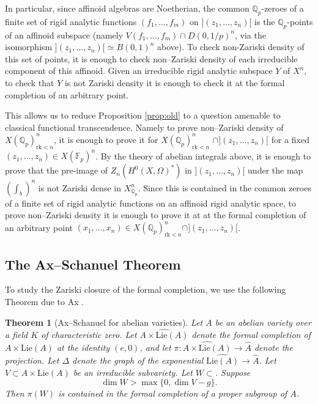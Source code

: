 \documentclass{amsart}
\def\Q{\mathbb Q}
\newcommand{\rk}{\mathrm{rk}}
\theoremstyle{plain}
\newtheorem{theorem}{Theorem}
\theoremstyle{definition}
\newcommand{\Lie}{\mathrm{Lie}}
\newcommand{\F}{\mathbb{F}}
\begin{document}
In particular, since affinoid algebras are Noetherian, the common $\Q _p $-zeroes of a finite set of rigid analytic functions $(f_1 ,\ldots ,f_m )$ on $](z_1 ,\ldots ,z_n )[$ is the $\Q _p $-points of an affinoid subspace (namely $V(f_1 ,\ldots ,f_m )\cap D(0,1/p)^n$, via the isomorphism $](z_1 ,\ldots ,z_n )[\simeq B(0,1)^n$ above). To check non-Zariski density of this set of points, it is enough to check non--Zariski density of each irreducible component of this affinoid. Given an irreducible rigid analytic subspace $Y$ of $X^n$, to check that $Y$ is not Zariski density it is enough to check it at the formal completion of an arbitrary point.

This allows us to reduce Proposition \ref{prop:old} to a question amenable to classical functional transcendence. Namely to prove non--Zariski density of $X(\Q _p )^n _{\rk <n}$, it is enough to prove it for $X(\Q _p )^n _{\rk <n}$ $ \cap ](z_1 ,\ldots ,z_n )[$ for a fixed $(z_1 ,\ldots ,z_n )\in X(\F _p )^n $. By the theory of abelian integrals above, it is enough to prove that the pre-image of $Z_n (H^0 (X,\Omega )^* )$ in $](z_1 ,\ldots ,z_n )[$ under the map $(\int _b )^n $ is not Zariski dense in $X^n _{\Q _p }$. Since this is contained in the common zeroes of a finite set of rigid analytic functions on an affinoid rigid analytic space, to prove non--Zariski density it is enough to prove it at at the formal completion of an arbitrary point $(x_1 ,\ldots ,x_n )\in X(\Q _p )^n _{\rk <n} \cap ](z_1 ,\ldots , z_n )[$.
\subsection{The Ax--Schanuel Theorem}
To study the Zariski closure of the formal completion, we use the following Theorem due to Ax \cite{ax1972some}.
\begin{theorem}[Ax--Schanuel for abelian varieties]\label{thm:AS}
Let $A$ be an abelian variety over a field $K$ of characteristic zero. Let $\widehat{A\times \Lie (A)}$ denote the formal completion of $A\times \Lie (A)$ at the identity $(e,0)$, and let $\pi :\widehat{A\times \Lie (A)}\to \widehat{A}$ denote the projection. Let $\Delta $ denote the graph of the exponential $\widehat{\Lie (A)}\to \widehat{A}$. Let $V\subset A\times \Lie (A)$ be an irreducible subvariety. Let $W\subset $. Suppose 
\[
\dim W >\max \{0,\dim V-g\}.
\]
Then $\pi (W)$ is contained in the formal completion of a proper subgroup of $A$.
\end{theorem}
\end{document}

